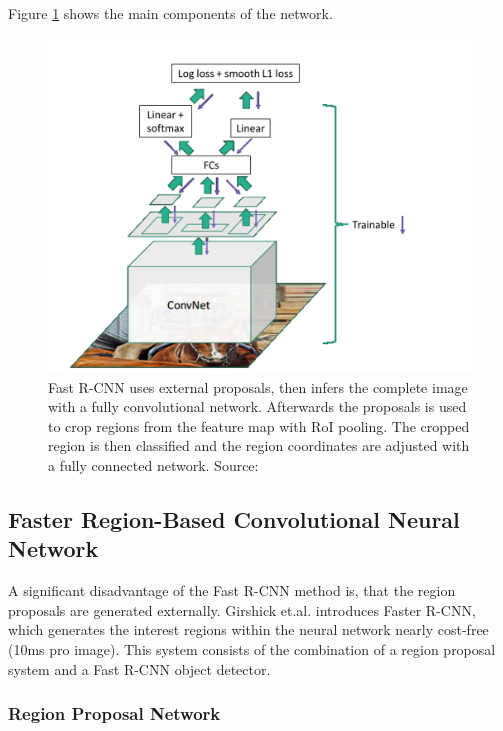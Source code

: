 Figure \ref{fig:fastrcnn} shows the main components of the network.
\bigbreak
\begin{figure}[h!]
	\centering
	\includegraphics[width=12cm]{images/mt/fast-rcnn.png}
	\caption{Fast R-CNN uses external proposals, then infers the complete image with a fully convolutional network. Afterwards the proposals is used to crop regions from the feature map with RoI pooling. The cropped region is then classified and the region coordinates are adjusted with a fully connected network. Source: \cite{Girshick16}}
	\label{fig:fastrcnn}
\end{figure}
\bigbreak
\subsection{Faster Region-Based Convolutional Neural Network}\label{s:fasterrcnn}

A significant disadvantage of the Fast R-CNN method is, that the region proposals are generated externally. Girshick et.al. \cite{NIPS2015_5638} introduces Faster R-CNN, which generates the interest regions within the neural network nearly cost-free (10ms pro image). This system consists of the combination of a region proposal system and a Fast R-CNN object detector.
\bigbreak
\subsubsection{Region Proposal Network}

